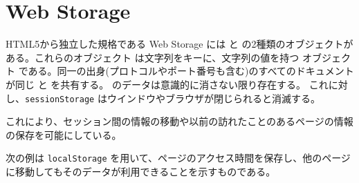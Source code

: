 \section{Web Storage}
HTML5から独立した規格である Web Storage には  と
 の2種類のオブジェクトがある。これらのオブジェクト
は文字列をキーに、文字列の値を持つ  オブジェクト
である。同一の出身(プロトコルやポート番号も含む)のすべてのドキュメント
が同じ  と  を共有する。
 のデータは意識的に消さない限り存在する。
%
これに対し、\texttt{sessionStorage} はウインドウやブラウザが閉じられると消滅する。

これにより、セッション間の情報の移動や以前の訪れたことのあるページの情報
の保存を可能にしている。

\begin{Exec}\upshape\label{storageEx}
次の例は \texttt{localStorage} を用いて、ページのアクセス時間を保存し、他のページ
 に移動してもそのデータが利用できることを示すものである。


\end{Exec}
